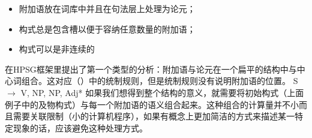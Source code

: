 \begin{itemize}
\item 附加语放在词库中\citep*{NB94,BMS2001a}并且在句法层上处理为论元；
\item 构式总是包含槽以便于容纳任意数量的附加语；
\item 构式可以是非连续的
\end{itemize}
 \citet{Kasper94a}在HPSG框架里提出了第一个类型的分析：附加语与论元在一个扁平的结构中与中心词组合。这对应（）中的统制规则，但是统制规则没有说明附加语的位置。
\ea
S $\to$ V, NP, NP, Adj*
\z
如果我们想得到整个结构的意义，就需要将初始构式（上面例子中的及物构式）与每一个附加语的语义组合起来。这种组合的计算量并不小而且需要关联限制（小的计算机程序），如果有概念上更加简洁的方式来描述某一特定现象的话，应该避免这种处理方式。

